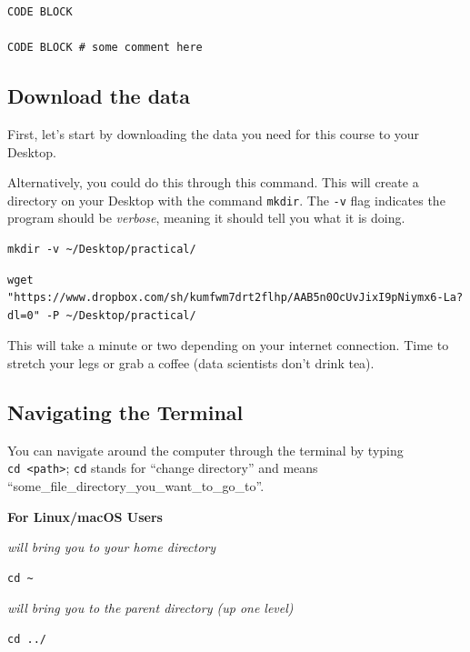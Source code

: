 \documentclass[
]{book}
\begin{document}
\begin{verbatim}
CODE BLOCK

CODE BLOCK # some comment here
\end{verbatim}

\hypertarget{download-the-data}{%
\subsection{Download the data}\label{download-the-data}}

First, let's start by downloading the data you need for this course to your Desktop.

Alternatively, you could do this through this command. This will create a directory on your Desktop with the command \texttt{mkdir}. The \texttt{-v} flag indicates the program should be \emph{verbose}, meaning it should tell you what it is doing.

\begin{verbatim}
mkdir -v ~/Desktop/practical/
\end{verbatim}

\begin{verbatim}
wget "https://www.dropbox.com/sh/kumfwm7drt2flhp/AAB5n0OcUvJixI9pNiymx6-La?dl=0" -P ~/Desktop/practical/
\end{verbatim}

This will take a minute or two depending on your internet connection. Time to stretch your legs or grab a coffee (data scientists don't drink tea).

\hypertarget{navigating-the-terminal}{%
\subsection{Navigating the Terminal}\label{navigating-the-terminal}}

You can navigate around the computer through the terminal by typing \texttt{cd\ \textless{}path\textgreater{}}; \texttt{cd} stands for ``change directory'' and means ``some\_file\_directory\_you\_want\_to\_go\_to''.

\textbf{For Linux/macOS Users}

\emph{will bring you to your home directory}

\begin{verbatim}
cd ~ 
\end{verbatim}

\emph{will bring you to the parent directory (up one level) }

\begin{verbatim}
cd ../ 
\end{verbatim}
\end{document}
